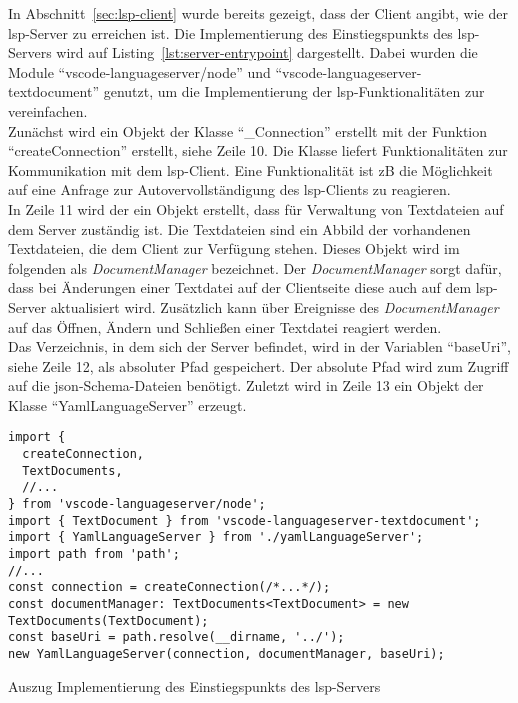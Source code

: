 In Abschnitt~\ref{sec:lsp-client} wurde bereits gezeigt, dass der Client angibt, wie der \ac{lsp}-Server zu erreichen ist.
Die Implementierung des Einstiegspunkts des \ac{lsp}-Servers wird auf Listing~\ref{lst:server-entrypoint} dargestellt.
Dabei wurden die Module ``vscode-languageserver/node'' und ``vscode-languageserver-textdocument'' genutzt, um die
Implementierung der \ac{lsp}-Funktionalitäten zur vereinfachen.
\\
Zunächst wird ein Objekt der Klasse ``\_Connection'' erstellt mit der Funktion ``createConnection'' erstellt, siehe Zeile 10.
Die Klasse liefert Funktionalitäten zur Kommunikation mit dem \ac{lsp}-Client.
Eine Funktionalität ist \ac{zB} die Möglichkeit auf eine Anfrage zur Autovervollständigung des \ac{lsp}-Clients zu reagieren.
\\
In Zeile 11 wird der ein Objekt erstellt, dass für Verwaltung von Textdateien auf dem Server zuständig ist.
Die Textdateien sind ein Abbild der vorhandenen Textdateien, die dem Client zur Verfügung stehen.
Dieses Objekt wird im folgenden als \textit{DocumentManager} bezeichnet.
Der \textit{DocumentManager} sorgt dafür, dass bei Änderungen einer Textdatei auf der Clientseite diese auch auf dem \ac{lsp}-Server aktualisiert wird.
Zusätzlich kann über Ereignisse des \textit{DocumentManager} auf das Öffnen, Ändern und Schließen einer Textdatei reagiert werden.
\\
Das Verzeichnis, in dem sich der Server befindet, wird in der Variablen ``baseUri'', siehe Zeile 12, als absoluter Pfad gespeichert.
Der absolute Pfad wird zum Zugriff auf die \ac{json}-Schema-Dateien benötigt.
Zuletzt wird in Zeile 13 ein Objekt der Klasse ``YamlLanguageServer'' erzeugt.

\begin{listing}[htp]
      \begin{verbatim}
import { 
  createConnection, 
  TextDocuments, 
  //...
} from 'vscode-languageserver/node';
import { TextDocument } from 'vscode-languageserver-textdocument';
import { YamlLanguageServer } from './yamlLanguageServer';
import path from 'path';
//...
const connection = createConnection(/*...*/);
const documentManager: TextDocuments<TextDocument> = new TextDocuments(TextDocument);
const baseUri = path.resolve(__dirname, '../');
new YamlLanguageServer(connection, documentManager, baseUri);
      \end{verbatim}
      \caption{Auszug Implementierung des Einstiegspunkts des \acs{lsp}-Servers}
      \label{lst:server-entrypoint}
\end{listing}



